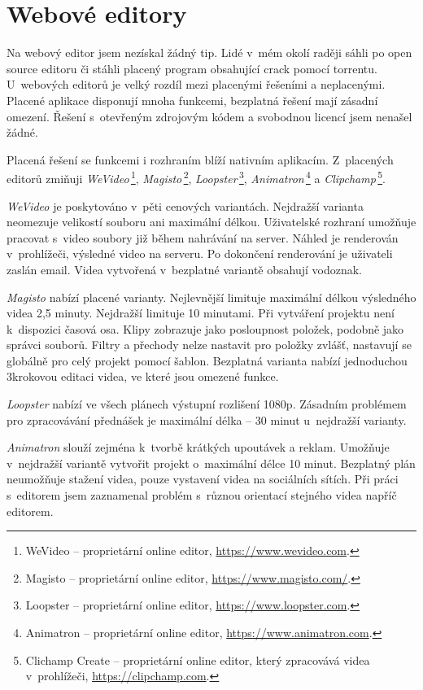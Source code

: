 \section{Webové editory}
Na webový editor jsem nezískal žádný tip. Lidé v~mém okolí raději sáhli po open source editoru či stáhli placený program obsahující crack pomocí torrentu. U~webových editorů je velký rozdíl mezi placenými řešeními a neplacenými. Placené aplikace disponují mnoha funkcemi, bezplatná řešení mají zásadní omezení. Řešení s~otevřeným zdrojovým kódem a svobodnou licencí jsem nenašel žádné.

Placená řešení se funkcemi i rozhraním blíží nativním aplikacím. Z~placených editorů zmiňuji \textit{WeVideo}\,\footnote{WeVideo -- proprietární online editor, \url{https://www.wevideo.com}.}, \textit{Magisto}\,\footnote{Magisto -- proprietární online editor, \url{https://www.magisto.com/}.}, \textit{Loopster}\,\footnote{Loopster -- proprietární online editor, \url{https://www.loopster.com}.}, \textit{Animatron}\,\footnote{Animatron -- proprietární online editor, \url{https://www.animatron.com}.} a \textit{Clipchamp}\,\footnote{Clichamp Create -- proprietární online editor, který zpracovává videa v~prohlížeči, \url{https://clipchamp.com}.}.

\textit{WeVideo} je poskytováno v~pěti cenových variantách. Nejdražší varianta neomezuje velikostí souboru ani maximální délkou. Uživatelské rozhraní umožňuje pracovat s~video soubory již během nahrávání na server. Náhled je renderován v~prohlížeči, výsledné video na serveru. Po dokončení renderování je uživateli zaslán email. Videa vytvořená v~bezplatné variantě obsahují vodoznak.

\textit{Magisto} nabízí placené varianty. Nejlevnější limituje maximální délkou výsledného videa 2,5 minuty. Nejdražší limituje 10 minutami. Při vytváření projektu není k~dispozici časová osa. Klipy zobrazuje jako posloupnost položek, podobně jako správci souborů. Filtry a přechody nelze nastavit pro položky zvlášť, nastavují se globálně pro celý projekt pomocí šablon. Bezplatná varianta nabízí jednoduchou 3krokovou editaci videa, ve které jsou omezené funkce.

\textit{Loopster} nabízí ve všech plánech výstupní rozlišení 1080p. Zásadním problémem pro zpracovávání přednášek je maximální délka -- 30 minut u~nejdražší varianty.

\textit{Animatron} slouží zejména k~tvorbě krátkých upoutávek a reklam. Umožňuje v~nejdražší variantě vytvořit projekt o~maximální délce 10 minut. Bezplatný plán neumožňuje stažení videa, pouze vystavení videa na sociálních sítích. Při práci s~editorem jsem zaznamenal problém s~různou orientací stejného videa napříč editorem.

